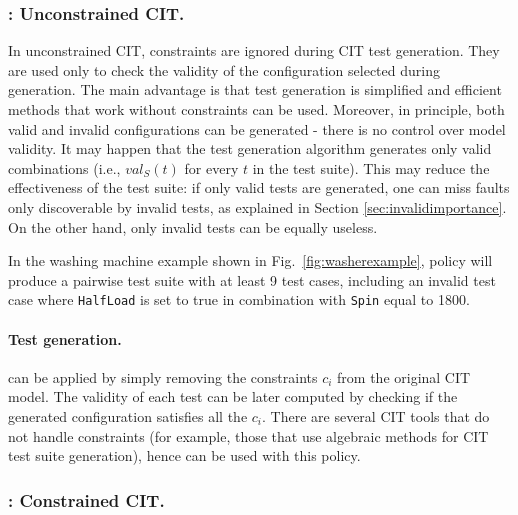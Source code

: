 \begin{tikzborder}{\cite{Gargantini16:validation}}
	\subsubsection{\ic: Unconstrained CIT.}
	\bb
	In unconstrained CIT, constraints are ignored during CIT test generation.
	They are used only to check the validity of the configuration
	selected during generation. The main advantage is that test generation
	is simplified and efficient methods that work without constraints
	can be used. Moreover, in principle, both valid and invalid configurations
	can be generated - there is no control over
	model validity. It may happen that the test generation algorithm generates
	only valid combinations (i.e., $val_{S}(t)$ for every $t$ in the test
	suite). This may reduce the effectiveness of the test suite: if only valid tests are generated, one can miss faults only discoverable by invalid tests, as explained in Section \ref{sec:invalidimportance}. On the other hand, only invalid tests can be equally useless.
	
	\begin{example}
		In the washing machine example shown in Fig.~\ref{fig:washerexample}, 
		\ic policy will produce a pairwise test suite with at least 9 test cases, including an invalid test case
		where \texttt{HalfLoad} is set to true in combination with \texttt{Spin} equal to 1800.
	\end{example}
	\paragraph*{Test generation.}
	\ic can be applied by simply removing the constraints $c_i$ from the original CIT model. The validity of each test can be later computed by checking if the generated configuration satisfies all the $c_i$. There are several CIT tools that do not handle constraints (for example, those that use algebraic methods for CIT test suite generation), hence can be used with this policy.
	
	
	
	\subsubsection{\ccit: Constrained CIT.}
	

\end{tikzborder}

